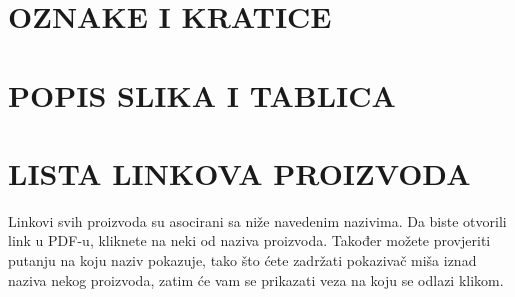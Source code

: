 \documentclass[14pt]{article}
\begin{document}
\clearpage
\section{OZNAKE I KRATICE}

\clearpage
\section{POPIS SLIKA I TABLICA}
\listoffigures
\listoftables

\clearpage
\section{LISTA LINKOVA PROIZVODA}
Linkovi svih proizvoda su asocirani sa niže navedenim nazivima. Da biste otvorili link u PDF-u, kliknete na neki od naziva proizvoda. Također možete provjeriti putanju na koju naziv pokazuje, tako što ćete zadržati pokazivač miša iznad naziva nekog proizvoda, zatim će vam se prikazati veza na koju se odlazi klikom.
\end{document}
